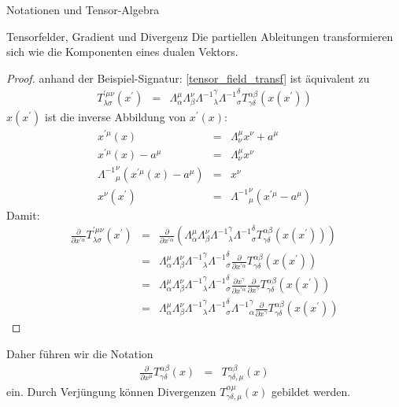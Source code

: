 \begin{chapter}{\titlestr}
\begin{section}{Notationen und Tensor-Algebra}
\begin{subsection}{Tensorfelder, Gradient und Divergenz}
Die partiellen Ableitungen transformieren sich wie die Komponenten eines dualen Vektors.
\begin{proof}
anhand der Beispiel-Signatur:
\ref{tensor_field_transf} ist äquivalent zu
\begin{eqnarray*}
T^{\prime\mu\nu}_{\lambda\sigma}(x^\prime)
&=& \Lambda^\mu_\alpha\Lambda^\nu_\beta {\Lambda^{-1}}_\lambda^\gamma{\Lambda^{-1}}_\sigma^\delta T^{\alpha\beta}_{\gamma\delta}(x(x^\prime))
\end{eqnarray*}
$x(x^\prime)$ ist die inverse Abbildung von $x^\prime(x)$:
\begin{eqnarray*}
x^{\prime\mu}(x) &=& \Lambda^\mu_\nu x^\nu+a^\mu\\
x^{\prime\mu}(x)-a^\mu &=& \Lambda^\mu_\nu x^\nu\\
{\Lambda^{-1}}^\nu_\mu\left(x^{\prime\mu}(x)-a^\mu\right) &=& x^\nu\\
x^\nu(x^\prime) &=& {\Lambda^{-1}}^\nu_\mu\left(x^{\prime\mu}-a^\mu\right) 
\end{eqnarray*}
Damit:
\begin{eqnarray*}
\frac{\partial}{\partial x^{\prime \alpha}}T^{\prime\mu\nu}_{\lambda\sigma}(x^\prime)
&=& \frac{\partial}{\partial x^{\prime \alpha}}\left(\Lambda^\mu_\alpha\Lambda^\nu_\beta {\Lambda^{-1}}_\lambda^\gamma{\Lambda^{-1}}_\sigma^\delta T^{\alpha\beta}_{\gamma\delta}(x(x^\prime))\right)\\
&=& \Lambda^\mu_\alpha\Lambda^\nu_\beta {\Lambda^{-1}}_\lambda^\gamma{\Lambda^{-1}}_\sigma^\delta \frac{\partial}{\partial x^{\prime \alpha}}T^{\alpha\beta}_{\gamma\delta}(x(x^\prime))\\
&=& \Lambda^\mu_\alpha\Lambda^\nu_\beta {\Lambda^{-1}}_\lambda^\gamma{\Lambda^{-1}}_\sigma^\delta \frac{\partial x^\gamma}{\partial x^{\prime \alpha}}\frac{\partial}{\partial x^\gamma}T^{\alpha\beta}_{\gamma\delta}(x(x^\prime))\\
&=& \Lambda^\mu_\alpha\Lambda^\nu_\beta {\Lambda^{-1}}_\lambda^\gamma{\Lambda^{-1}}_\sigma^\delta {\Lambda^{-1}}^\gamma_\alpha\frac{\partial}{\partial x^\gamma}T^{\alpha\beta}_{\gamma\delta}(x(x^\prime))
\end{eqnarray*}
\end{proof}Daher führen wir die Notation
\begin{eqnarray*}
\frac{\partial}{\partial x^\mu} T^{\alpha\beta}_{\gamma\delta}(x) &=& T^{\alpha\beta}_{\gamma\delta,\mu}(x)
\end{eqnarray*}
ein. Durch Verjüngung können Divergenzen $T^{\alpha\mu}_{\gamma\delta,\mu}(x)$ gebildet werden.

\end{subsection}
\end{section}
\end{chapter}
